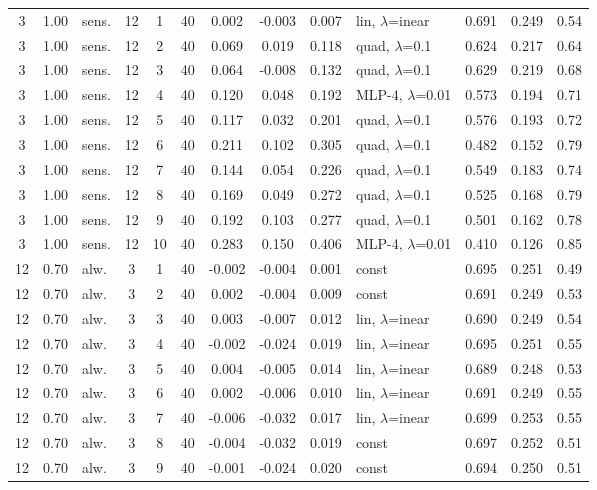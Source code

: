 \begin{scriptsize}
\begin{longtable}{cclcc c ccc l ccc}
3 & 1.00 & sens. & 12 & 1 & 40 & 0.002 & -0.003 & 0.007 & lin, $\lambda$=inear & 0.691 & 0.249 & 0.54 \\
3 & 1.00 & sens. & 12 & 2 & 40 & 0.069 & 0.019 & 0.118 & quad, $\lambda$=0.1 & 0.624 & 0.217 & 0.64 \\
3 & 1.00 & sens. & 12 & 3 & 40 & 0.064 & -0.008 & 0.132 & quad, $\lambda$=0.1 & 0.629 & 0.219 & 0.68 \\
3 & 1.00 & sens. & 12 & 4 & 40 & 0.120 & 0.048 & 0.192 & MLP-4, $\lambda$=0.01 & 0.573 & 0.194 & 0.71 \\
3 & 1.00 & sens. & 12 & 5 & 40 & 0.117 & 0.032 & 0.201 & quad, $\lambda$=0.1 & 0.576 & 0.193 & 0.72 \\
3 & 1.00 & sens. & 12 & 6 & 40 & 0.211 & 0.102 & 0.305 & quad, $\lambda$=0.1 & 0.482 & 0.152 & 0.79 \\
3 & 1.00 & sens. & 12 & 7 & 40 & 0.144 & 0.054 & 0.226 & quad, $\lambda$=0.1 & 0.549 & 0.183 & 0.74 \\
3 & 1.00 & sens. & 12 & 8 & 40 & 0.169 & 0.049 & 0.272 & quad, $\lambda$=0.1 & 0.525 & 0.168 & 0.79 \\
3 & 1.00 & sens. & 12 & 9 & 40 & 0.192 & 0.103 & 0.277 & quad, $\lambda$=0.1 & 0.501 & 0.162 & 0.78 \\
3 & 1.00 & sens. & 12 & 10 & 40 & 0.283 & 0.150 & 0.406 & MLP-4, $\lambda$=0.01 & 0.410 & 0.126 & 0.85 \\
12 & 0.70 & alw. & 3 & 1 & 40 & -0.002 & -0.004 & 0.001 & const & 0.695 & 0.251 & 0.49 \\
12 & 0.70 & alw. & 3 & 2 & 40 & 0.002 & -0.004 & 0.009 & const & 0.691 & 0.249 & 0.53 \\
12 & 0.70 & alw. & 3 & 3 & 40 & 0.003 & -0.007 & 0.012 & lin, $\lambda$=inear & 0.690 & 0.249 & 0.54 \\
12 & 0.70 & alw. & 3 & 4 & 40 & -0.002 & -0.024 & 0.019 & lin, $\lambda$=inear & 0.695 & 0.251 & 0.55 \\
12 & 0.70 & alw. & 3 & 5 & 40 & 0.004 & -0.005 & 0.014 & lin, $\lambda$=inear & 0.689 & 0.248 & 0.53 \\
12 & 0.70 & alw. & 3 & 6 & 40 & 0.002 & -0.006 & 0.010 & lin, $\lambda$=inear & 0.691 & 0.249 & 0.55 \\
12 & 0.70 & alw. & 3 & 7 & 40 & -0.006 & -0.032 & 0.017 & lin, $\lambda$=inear & 0.699 & 0.253 & 0.55 \\
12 & 0.70 & alw. & 3 & 8 & 40 & -0.004 & -0.032 & 0.019 & const & 0.697 & 0.252 & 0.51 \\
12 & 0.70 & alw. & 3 & 9 & 40 & -0.001 & -0.024 & 0.020 & const & 0.694 & 0.250 & 0.51 \\

\end{longtable}
\end{scriptsize}
